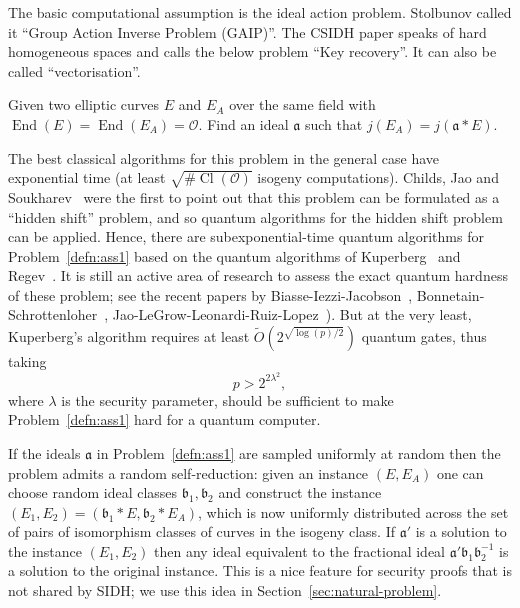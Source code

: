 \documentclass{llncs}
\newcommand{\OO}{\mathcal{O}}
\DeclareMathOperator{\End}{End}
\DeclareMathOperator{\Cl}{Cl}
\renewcommand{\a}{\mathfrak{a}}
\renewcommand{\b}{\mathfrak{b}}
\begin{document}
The basic computational assumption is the ideal action problem.
Stolbunov called it ``Group Action Inverse Problem (GAIP)''.
The CSIDH paper speaks of hard homogeneous spaces and calls the below problem ``Key recovery''.
It can also be called ``vectorisation''.

\begin{problem}\label{defn:ass1}
Given two elliptic curves $E$ and $E_A$ over the same field with $\End(E) = \End(E_A) = \OO$. Find an ideal $\a$ such that $j( E_A ) = j( \a * E )$.
\end{problem}

The best classical algorithms for this problem in the general case have exponential time (at least $\sqrt{ \# \Cl( \OO ) }$ isogeny computations).
Childs, Jao and Soukharev~\cite{childs2014constructing} were the first to point out that this problem can be formulated as a ``hidden shift'' problem, and so quantum algorithms for the hidden shift problem can be applied.
Hence, there are subexponential-time quantum algorithms for Problem~\ref{defn:ass1} based on the quantum algorithms of Kuperberg~\cite{Kup} and Regev~\cite{regev04}. 
It is still an active area of research to assess the exact quantum hardness of these problem; see the recent papers by Biasse-Iezzi-Jacobson~\cite{BIJ18}, Bonnetain-Schrottenloher~\cite{BS18}, Jao-LeGrow-Leonardi-Ruiz-Lopez~\cite{JLGLRL18}).
But at the very least, Kuperberg's algorithm requires at least $\tilde{O}( 2^{\sqrt{\log(p)/2}} )$ quantum gates, thus taking 
\begin{equation} \label{con1}
   p>2^{2\lambda^2},
\end{equation}
where $\lambda$ is the security parameter,
should be sufficient to make Problem~\ref{defn:ass1} hard for a quantum computer.


If the ideals $\a$ in Problem~\ref{defn:ass1} are sampled uniformly at random then the problem admits a random self-reduction: given an instance $(E, E_A)$ one can choose random ideal classes $\b_1, \b_2$ and construct the instance $(E_1, E_2) = (\b_1 * E, \b_2 * E_A )$, which is now uniformly distributed across the set of pairs of isomorphism classes of curves in the isogeny class.
If $\a'$ is a solution to the instance $(E_1, E_2)$ then any ideal equivalent to the fractional ideal $\a'\b_1 \b_2^{-1}$ is a solution to the original instance.
This is a nice feature for security proofs that is not shared by SIDH; we use this idea in Section~\ref{sec:natural-problem}.
\end{document}
